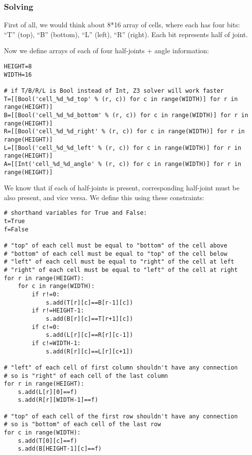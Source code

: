 \subsubsection{Solving}

First of all, we would think about 8*16 array of cells, where each has four bits:
``T'' (top),
``B'' (bottom),
``L'' (left),
``R'' (right).
Each bit represents half of joint.



Now we define arrays of each of four half-joints + angle information:

\begin{lstlisting}
HEIGHT=8
WIDTH=16

# if T/B/R/L is Bool instead of Int, Z3 solver will work faster
T=[[Bool('cell_%d_%d_top' % (r, c)) for c in range(WIDTH)] for r in range(HEIGHT)]
B=[[Bool('cell_%d_%d_bottom' % (r, c)) for c in range(WIDTH)] for r in range(HEIGHT)]
R=[[Bool('cell_%d_%d_right' % (r, c)) for c in range(WIDTH)] for r in range(HEIGHT)]
L=[[Bool('cell_%d_%d_left' % (r, c)) for c in range(WIDTH)] for r in range(HEIGHT)]
A=[[Int('cell_%d_%d_angle' % (r, c)) for c in range(WIDTH)] for r in range(HEIGHT)]
\end{lstlisting}

We know that if each of half-joints is present, corresponding half-joint must be also present, and vice versa.
We define this using these constraints:

\begin{lstlisting}
# shorthand variables for True and False:
t=True
f=False

# "top" of each cell must be equal to "bottom" of the cell above
# "bottom" of each cell must be equal to "top" of the cell below
# "left" of each cell must be equal to "right" of the cell at left
# "right" of each cell must be equal to "left" of the cell at right
for r in range(HEIGHT):
    for c in range(WIDTH):
        if r!=0:
            s.add(T[r][c]==B[r-1][c])
        if r!=HEIGHT-1:
            s.add(B[r][c]==T[r+1][c])
        if c!=0:
            s.add(L[r][c]==R[r][c-1])
        if c!=WIDTH-1:
            s.add(R[r][c]==L[r][c+1])

# "left" of each cell of first column shouldn't have any connection
# so is "right" of each cell of the last column
for r in range(HEIGHT):
    s.add(L[r][0]==f)
    s.add(R[r][WIDTH-1]==f)

# "top" of each cell of the first row shouldn't have any connection
# so is "bottom" of each cell of the last row
for c in range(WIDTH):
    s.add(T[0][c]==f)
    s.add(B[HEIGHT-1][c]==f)
\end{lstlisting}

